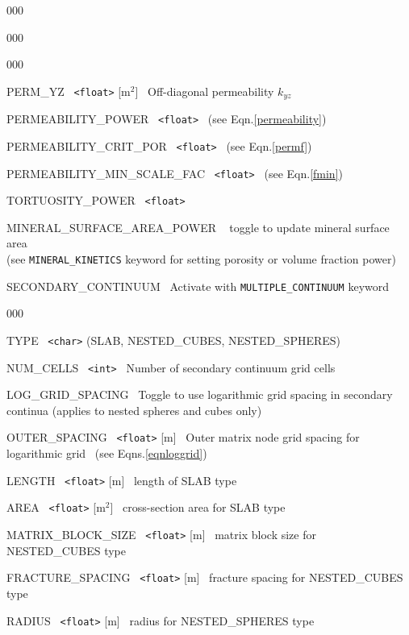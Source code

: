\begin{deflist}{000}
\begin{deflist}{000}
\begin{deflist}{000}
\item[PERM\_YZ] \ {\tt <float>} [m$^2$] \ Off-diagonal permeability $k_{yz}$
\end{deflist}
\item[\keyend]
\item[PERMEABILITY\_POWER] \ {\tt <float>} \ (see Eqn.\eqref{permeability})
\item[PERMEABILITY\_CRIT\_POR] \ {\tt <float>} \ (see Eqn.\eqref{permf})
\item[PERMEABILITY\_MIN\_SCALE\_FAC] \ {\tt <float>} \ (see Eqn.\eqref{fmin})
\item[TORTUOSITY\_POWER] \ {\tt <float>}
\item[MINERAL\_SURFACE\_AREA\_POWER] ~ toggle to update mineral surface area \\(see {\tt MINERAL\_KINETICS} keyword for setting porosity or volume fraction power)
\item[SECONDARY\_CONTINUUM] \ Activate with {\tt MULTIPLE\_CONTINUUM} keyword 
\begin{deflist}{000}
\item[TYPE] \ {\tt <char>} (SLAB, NESTED\_CUBES, NESTED\_SPHERES)
\item[NUM\_CELLS] \ {\tt <int>} \ Number of secondary continuum grid cells
\item[LOG\_GRID\_SPACING] \ Toggle to use logarithmic grid spacing in secondary continua (applies to nested spheres and cubes only)
\item[OUTER\_SPACING] \ {\tt <float>} [m] \ Outer matrix node grid spacing for logarithmic grid \ (see Eqns.\eqref{eqnloggrid})
\item[LENGTH] \ {\tt <float>} [m] \ length of SLAB type
\item[AREA] \ {\tt <float>} [m$^2$] \ cross-section area for SLAB type
\item[MATRIX\_BLOCK\_SIZE] \ {\tt <float>} [m] \ matrix block size for NESTED\_CUBES type
\item[FRACTURE\_SPACING] \ {\tt <float>} [m] \ fracture spacing for NESTED\_CUBES type
\item[RADIUS] \ {\tt <float>} [m] \ radius for NESTED\_SPHERES type

\end{deflist}
\end{deflist}
\end{deflist}
